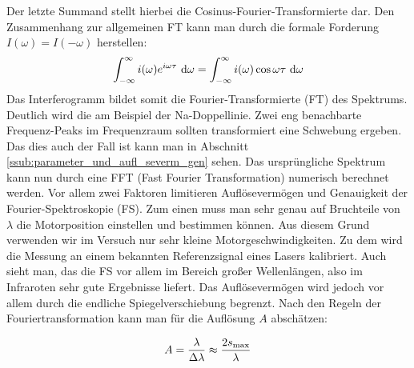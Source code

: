 		Der letzte Summand stellt hierbei die Cosinus-Fourier-Transformierte dar.
		Den Zusammenhang zur allgemeinen FT kann man durch die formale Forderung $I(\omega) = I(- \omega) $ herstellen:
		\[ \int_{- \infty}^{\infty} i(\omega) e^{i \omega \tau} \ \mathrm{d} \omega = \int_{- \infty}^{\infty}  i(\omega) \cos\omega\tau \ \mathrm{d} \omega \]
		Das Interferogramm bildet somit die Fourier-Transformierte (FT) des Spektrums.
		Deutlich wird die am Beispiel der Na-Doppellinie.
		Zwei eng benachbarte Frequenz-Peaks im Frequenzraum sollten transformiert eine Schwebung ergeben.
		Das dies auch der Fall ist kann man in Abschnitt \ref{ssub:parameter_und_aufl_severm_gen} sehen.
		Das ursprüngliche Spektrum kann nun durch eine FFT (Fast Fourier Transformation) numerisch berechnet werden.
		Vor allem zwei Faktoren limitieren Auflösevermögen und Genauigkeit der Fourier-Spektroskopie (FS).
		Zum einen muss man sehr genau auf Bruchteile von $\lambda$ die Motorposition einstellen und bestimmen können.
		Aus diesem Grund verwenden wir im Versuch nur sehr kleine Motorgeschwindigkeiten.
		Zu dem wird die Messung an einem bekannten Referenzsignal eines Lasers kalibriert.
		Auch sieht man, das die FS vor allem im Bereich großer Wellenlängen, also im Infraroten sehr gute Ergebnisse liefert.
		Das Auflösevermögen wird jedoch vor allem durch die endliche Spiegelverschiebung begrenzt.
		Nach den Regeln der Fouriertransformation kann man für die Auflösung $A$ abschätzen:

		\[ A = \frac{\lambda}{\Delta \lambda} \approx \frac{2 s_{\mathrm{max}}}{\lambda } \]
